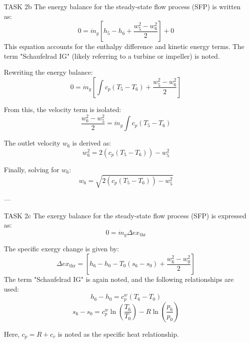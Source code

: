TASK 2b  
The energy balance for the steady-state flow process (SFP) is written as:  
\[
0 = \dot{m}_g \left[ h_5 - h_6 + \frac{w_5^2 - w_6^2}{2} \right] + 0
\]  
This equation accounts for the enthalpy difference and kinetic energy terms. The term "Schaufelrad IG" (likely referring to a turbine or impeller) is noted.  

Rewriting the energy balance:  
\[
0 = \dot{m}_g \left[ \int c_p (T_5 - T_6) + \frac{w_5^2 - w_6^2}{2} \right]
\]  

From this, the velocity term is isolated:  
\[
\frac{w_6^2 - w_5^2}{2} = \dot{m}_g \int c_p (T_5 - T_6)
\]  

The outlet velocity \( w_6 \) is derived as:  
\[
w_6^2 = 2 \left( c_p (T_5 - T_6) \right) - w_5^2
\]  

Finally, solving for \( w_6 \):  
\[
w_6 = \sqrt{2 \left( c_p (T_5 - T_6) \right) - w_5^2}
\]  

---

TASK 2c  
The exergy balance for the steady-state flow process (SFP) is expressed as:  
\[
0 = \dot{m}_g \Delta ex_{\text{thr}}
\]  

The specific exergy change is given by:  
\[
\Delta ex_{\text{thr}} = \left[ h_6 - h_0 - T_0 (s_6 - s_0) + \frac{w_6^2 - w_0^2}{2} \right]
\]  
The term "Schaufelrad IG" is again noted, and the following relationships are used:  
\[
h_6 - h_0 = c_p^w (T_6 - T_0)
\]  
\[
s_6 - s_0 = c_p^w \ln \left( \frac{T_6}{T_0} \right) - R \ln \left( \frac{p_6}{p_0} \right)
\]  

Here, \( c_p = R + c_v \) is noted as the specific heat relationship.